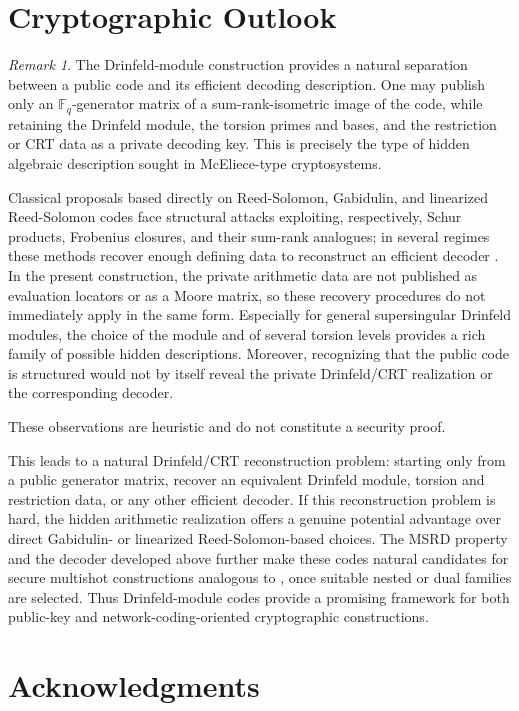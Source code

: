 \documentclass[10pt,a4paper]{amsart}
\theoremstyle{definition}
\theoremstyle{plain}
\theoremstyle{remark}
\newtheorem{remark}[definition]{Remark}
\newcommand{\vF}{\mathbb F}
\begin{document}
\section{Cryptographic Outlook}

\begin{remark}
The Drinfeld-module construction provides a natural separation between a
public code and its efficient decoding description.  One may publish only an
$\vF_q$-generator matrix of a sum-rank-isometric image of the code, while
retaining the Drinfeld module, the torsion primes and bases, and the
restriction or CRT data as a private decoding key.  This is precisely the type
of hidden algebraic description sought in McEliece-type cryptosystems.

Classical proposals based directly on Reed-Solomon, Gabidulin, and
linearized Reed-Solomon codes face structural attacks exploiting,
respectively, Schur products, Frobenius closures, and their sum-rank analogues;
in several regimes these methods recover enough defining data to reconstruct
an efficient decoder \cite{BartzEtAl22,HBH23}.  In the present construction,
the private arithmetic data are not published as evaluation locators or as a
Moore matrix, so these recovery procedures do not immediately apply in the
same form. Especially for general supersingular Drinfeld modules, the
choice of the module and of several torsion levels provides a rich family of
possible hidden descriptions.  Moreover, recognizing that the public code is
structured would not by itself reveal the private Drinfeld/CRT realization or
the corresponding decoder.

These observations are heuristic and do not constitute a security proof.

This leads to a natural Drinfeld/CRT reconstruction problem: starting only
from a public generator matrix, recover an equivalent Drinfeld module,
torsion and restriction data, or any other efficient decoder.  If this
reconstruction problem is hard, the hidden arithmetic realization offers a
genuine potential advantage over direct Gabidulin- or linearized
Reed-Solomon-based choices.  The MSRD property and the decoder developed
above further make these codes natural candidates for secure multishot
constructions analogous to \cite{MPK19}, once suitable nested or dual
families are selected.  Thus Drinfeld-module codes provide a promising
framework for both public-key and network-coding-oriented cryptographic
constructions.
\end{remark}

\section*{Acknowledgments}
\end{document}
